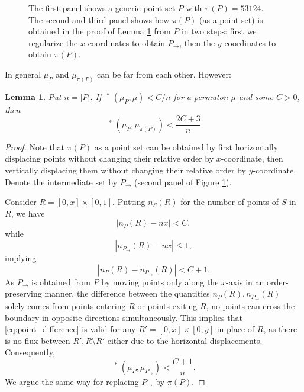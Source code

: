 \documentclass{article}
\newcommand{\ds}{\mathop{d_\square}}
\newtheorem{lemma}[theorem]{Lemma}
\theoremstyle{definition}
\begin{document}
\begin{figure}[htb]
\caption{The first panel shows a generic point set $P$ with $\pi(P)=53124$. The second and third panel shows how $\pi(P)$ (as a point set) is obtained in the proof of Lemma \ref{lemma:ds_permutation_regularization} from $P$ in two steps: first we regularize the $x$ coordinates to obtain $P_{\rightarrow}$, then the $y$ coordinates to obtain $\pi(P)$.} \label{fig:permutation_regularization}
\end{figure}

In general $\mu_P$ and $\mu_{\pi(P)}$ can be far from each other. However:

\begin{lemma} \label{lemma:ds_permutation_regularization}
    Put $n=|P|$. If ${\ds}^*(\mu_P, \mu)<C/n$ for a permuton $\mu$ and some $C>0$, then
    $${\ds}^*(\mu_P, \mu_{\pi(P)})<\frac{2C+3}{n}$$
\end{lemma}

\begin{proof}
    Note that $\pi(P)$ as a point set can be obtained by first horizontally displacing points without changing their relative order by $x$-coordinate, then vertically displacing them without changing their relative order by $y$-coordinate. Denote the intermediate set by $P_{\rightarrow}$ (second panel of Figure \ref{fig:permutation_regularization}).
    
    Consider $R=[0, x]\times [0, 1]$. Putting $n_S(R)$ for the number of points of $S$ in $R$, we have
    $$|n_P(R)-nx|< C,$$
    while
    $$|n_{P_{\rightarrow}}(R)-nx|\leq 1,$$
    implying
    \begin{equation}\label{eq:point_difference}
    |n_P(R)- n_{P_{\rightarrow}}(R)|<C+1.
    \end{equation}
    As $P_{\rightarrow}$ is obtained from $P$ by moving points only along the $x$-axis in an order-preserving manner, the difference between the quantities $n_P(R), n_{P_{\rightarrow}}(R)$ solely comes from points entering $R$ or points exiting $R$, no points can cross the boundary in opposite directions simultaneously. This implies that
    \eqref{eq:point_difference} is valid for any $R'=[0, x]\times [0, y]$ in place of $R$, as there is no flux between $R', R\setminus R'$ either due to the horizontal displacements. Consequently,
    $${\ds}^*(\mu_P, \mu_{P_{\rightarrow}})<\frac{C+1}{n}.$$
    We argue the same way for replacing $P_{\rightarrow}$ by $\pi(P)$.    
\end{proof}
\end{document}
